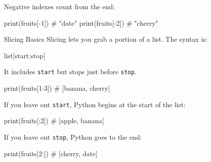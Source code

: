 \documentclass[
  letterpaper,
  DIV=11,
  numbers=noendperiod]{scrreprt}
\newenvironment{Shaded}{\begin{snugshade}}{\end{snugshade}}
\newcommand{\BuiltInTok}[1]{\textcolor[rgb]{0.00,0.23,0.31}{#1}}
\newcommand{\CommentTok}[1]{\textcolor[rgb]{0.37,0.37,0.37}{#1}}
\newcommand{\DecValTok}[1]{\textcolor[rgb]{0.68,0.00,0.00}{#1}}
\newcommand{\NormalTok}[1]{\textcolor[rgb]{0.00,0.23,0.31}{#1}}
\newcommand{\OperatorTok}[1]{\textcolor[rgb]{0.37,0.37,0.37}{#1}}
\begin{document}
Negative indexes count from the end:

\begin{Shaded}
\begin{Highlighting}[]
\BuiltInTok{print}\NormalTok{(fruits[}\OperatorTok{{-}}\DecValTok{1}\NormalTok{])  }\CommentTok{\# "date"}
\BuiltInTok{print}\NormalTok{(fruits[}\OperatorTok{{-}}\DecValTok{2}\NormalTok{])  }\CommentTok{\# "cherry"}
\end{Highlighting}
\end{Shaded}

Slicing Basics Slicing lets you grab a portion of a list. The syntax is:

\begin{Shaded}
\begin{Highlighting}[]
\BuiltInTok{list}\NormalTok{[start:stop]}
\end{Highlighting}
\end{Shaded}

It includes \texttt{start} but stops just before \texttt{stop}.

\begin{Shaded}
\begin{Highlighting}[]
\BuiltInTok{print}\NormalTok{(fruits[}\DecValTok{1}\NormalTok{:}\DecValTok{3}\NormalTok{])   }\CommentTok{\# [\textquotesingle{}banana\textquotesingle{}, \textquotesingle{}cherry\textquotesingle{}]}
\end{Highlighting}
\end{Shaded}

If you leave out \texttt{start}, Python begins at the start of the list:

\begin{Shaded}
\begin{Highlighting}[]
\BuiltInTok{print}\NormalTok{(fruits[:}\DecValTok{2}\NormalTok{])    }\CommentTok{\# [\textquotesingle{}apple\textquotesingle{}, \textquotesingle{}banana\textquotesingle{}]}
\end{Highlighting}
\end{Shaded}

If you leave out \texttt{stop}, Python goes to the end:

\begin{Shaded}
\begin{Highlighting}[]
\BuiltInTok{print}\NormalTok{(fruits[}\DecValTok{2}\NormalTok{:])    }\CommentTok{\# [\textquotesingle{}cherry\textquotesingle{}, \textquotesingle{}date\textquotesingle{}]}
\end{Highlighting}
\end{Shaded}
\end{document}
